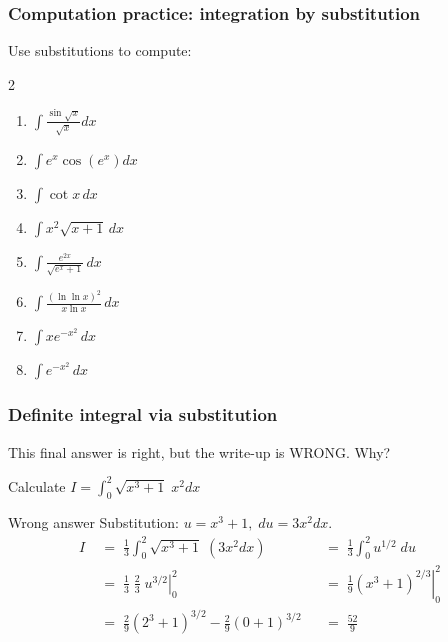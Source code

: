 \begin{frame}[t]
	\frametitle{Computation practice: integration by substitution}

	Use substitutions to compute:
	\begin{multicols}{2}
		\begin{enumerate}
			\item $\displaystyle \int \frac{\sin \sqrt{x}}{\sqrt{x}}dx$
				\vspace{.2cm}

			\item $\displaystyle \int e^{x}\cos \left(e^{x}\right) dx$
				\vspace{.2cm}

			\item $\displaystyle \int \cot x \, dx$
				\vspace{.2cm}

			\item $\displaystyle \int x^{2}\sqrt{x+1}\, dx$
				\vspace{.2cm}

			\item $\displaystyle \int \frac{e^{2x}}{\sqrt{e^{x}+ 1}}\, dx$
				\vspace{.2cm}

			\item $\displaystyle \int \frac{\left( \ln \ln x \right)^{2}}{ x \ln x}\, d
				x$
				\vspace{.2cm}

			\item $\displaystyle \int x e^{-x^2}\, dx$
				\vspace{.2cm}

			\item $\displaystyle \int e^{-x^2}\, dx$
				\vspace{.2cm}
		\end{enumerate}
	\end{multicols}
\end{frame}

\begin{frame}
	\fontsize{13}{13}\selectfont
	\frametitle{Definite integral via substitution}

	This final answer is right, but the write-up is WRONG. Why?
	\vfill

	Calculate $\displaystyle I = \int_{0}^{2}\sqrt{x^{3}+1}\; x^{2}dx$
	\begin{block}{Wrong answer}
		Substitution: $\displaystyle u = x^{3}+1, \; du=3x^{2}dx$.
		\begin{align*}
			I \; & = \; \frac{1}{3}\int_{0}^{2}\sqrt{x^{3}+1}\; (3x^{2}dx)                             &  & = \; \frac{1}{3}\int_{0}^{2}u^{1/2}\; du                             \\
			     & = \; \frac{1}{3}\; \frac{2}{3}\; \left. u^{3/2}\right\vert_{0}^{2}                  &  & = \; \left. \frac{1}{9}\left(x^{3}+1\right)^{2/3}\right\vert_{0}^{2} \\
			     & = \; \frac{2}{9}\left( 2^{3}+ 1 \right)^{3/2}- \frac{2}{9}\left( 0 + 1\right)^{3/2} &  & = \; \frac{52}{9}
		\end{align*}
	\end{block}
\end{frame}

